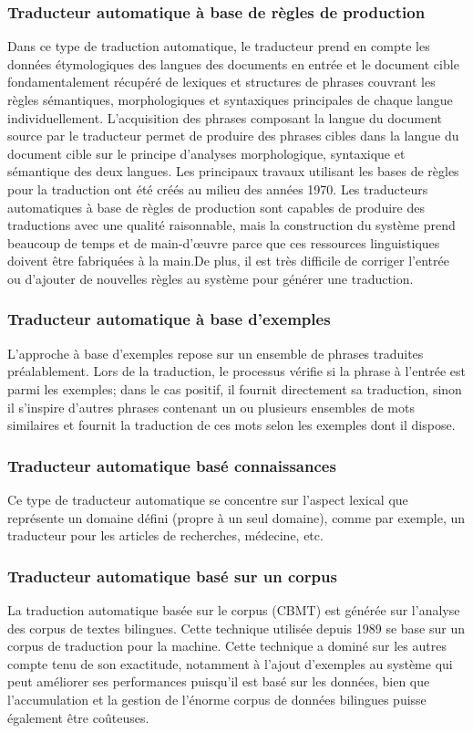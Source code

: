         \subsubsection{Traducteur automatique à base de règles de production}
        Dans ce type de traduction automatique, le traducteur prend en compte les données étymologiques des langues des documents en entrée et le document cible fondamentalement récupéré de 
        lexiques et structures de phrases couvrant les règles sémantiques, morphologiques et syntaxiques principales de chaque langue individuellement. L'acquisition des phrases composant la langue du document source par le traducteur permet de produire des phrases cibles dans la langue du document cible sur le principe d'analyses morphologique, syntaxique et sémantique des deux langues.
        Les principaux travaux utilisant les bases de règles pour la traduction ont été créés au milieu des années 1970\cite{surveyTraduction}.
        Les traducteurs automatiques à base de règles de production sont capables de produire des traductions avec une qualité raisonnable, mais la construction du système prend beaucoup de temps et de main-d'œuvre parce que ces ressources linguistiques doivent être fabriquées à la main.De plus, il est très difficile de corriger l'entrée ou d'ajouter de nouvelles règles au système pour générer une traduction\cite{jean}.
        \subsubsection{Traducteur automatique à base d'exemples}
        L'approche à base d'exemples repose sur un ensemble de phrases traduites préalablement. Lors de la traduction, le processus vérifie si la phrase à l'entrée est parmi les exemples; dans le cas positif, il fournit directement sa traduction, sinon il s'inspire d'autres phrases contenant un ou plusieurs ensembles de mots similaires et fournit la traduction de ces mots selon les exemples dont il dispose\cite{gent}.
        \subsubsection{Traducteur automatique basé connaissances}
        Ce type de traducteur automatique se concentre sur l'aspect lexical que représente un domaine défini (propre à un seul domaine), comme par exemple, un traducteur pour les articles de recherches, médecine, etc\cite{surveyTraduction}.
        \subsubsection{Traducteur automatique basé sur un corpus}
        La traduction automatique basée sur le corpus (CBMT) est générée sur l'analyse des corpus de textes bilingues. Cette technique utilisée depuis 1989 se base sur un corpus de traduction pour la machine. Cette technique a dominé sur les autres compte tenu de son exactitude, notamment à l'ajout d'exemples au système qui peut améliorer ses performances puisqu'il est basé sur les données, bien que l'accumulation et la gestion de l'énorme corpus de données bilingues puisse également être coûteuses\cite{jean}.
